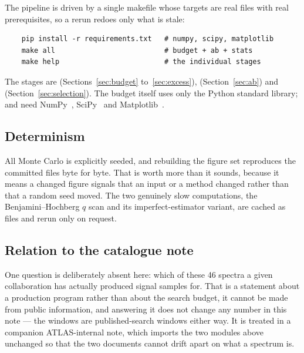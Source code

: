 The pipeline is driven by a single makefile whose targets are real files with real prerequisites,
so a rerun redoes only what is stale:

\begin{verbatim}
    pip install -r requirements.txt   # numpy, scipy, matplotlib
    make all                          # budget + ab + stats
    make help                         # the individual stages
\end{verbatim}

The stages are  (Sections~\ref{sec:budget} to~\ref{sec:excess}), 
(Section~\ref{sec:ab}) and  (Section~\ref{sec:selection}). The budget itself uses only
the Python standard library;  and  need NumPy~\cite{numpy},
SciPy~\cite{scipy} and Matplotlib~\cite{matplotlib}.

\subsection{Determinism}

All Monte Carlo is explicitly seeded, and rebuilding the figure set reproduces the committed files
byte for byte. That is worth more than it sounds, because it means a changed figure signals that an
input or a method changed rather than that a random seed moved. The two genuinely slow computations,
the Benjamini--Hochberg $q$ scan and its imperfect-estimator variant, are cached as 
files and rerun only on request.

\subsection{Relation to the catalogue note}

One question is deliberately absent here: which of these 46 spectra a given collaboration has
actually produced signal samples for. That is a statement about a production program rather than
about the search budget, it cannot be made from public information, and answering it does not change
any number in this note --- the windows are published-search windows either way. It is treated in a
companion ATLAS-internal note, which imports the two modules above unchanged so that the two
documents cannot drift apart on what a spectrum is.

